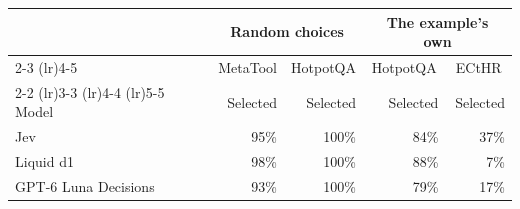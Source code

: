\begin{tabular}{lrrrr}
\toprule
 & \multicolumn{2}{c}{Random choices} & \multicolumn{2}{c}{The example's own} \\
\cmidrule(lr){2-3} \cmidrule(lr){4-5}
 & \multicolumn{1}{c}{MetaTool} & \multicolumn{1}{c}{HotpotQA} & \multicolumn{1}{c}{HotpotQA} & \multicolumn{1}{c}{ECtHR} \\
\cmidrule(lr){2-2} \cmidrule(lr){3-3} \cmidrule(lr){4-4} \cmidrule(lr){5-5}
Model & Selected & Selected & Selected & Selected \\
\midrule
Jev & 95\% & 100\% & 84\% & 37\% \\
Liquid d1 & 98\% & 100\% & 88\% & 7\% \\
GPT-6 Luna Decisions & 93\% & 100\% & 79\% & 17\% \\
\bottomrule
\end{tabular}

